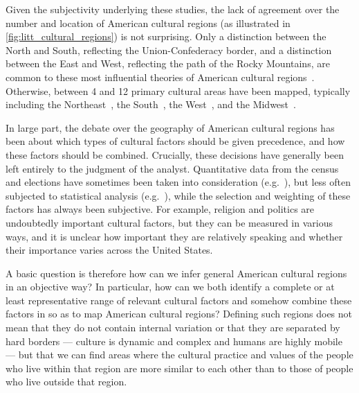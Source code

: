 \documentclass[../thesis.tex]{subfiles}
\begin{document}
Given the subjectivity underlying these studies, the lack of agreement over the number
and location of American cultural regions (as illustrated in
\cref{fig:litt_cultural_regions}) is not surprising. Only a distinction between the
North and South, reflecting the Union-Confederacy border, and a distinction between the
East and West, reflecting the path of the Rocky Mountains, are common to these most
influential theories of American cultural
regions~\cite{OdumSouthernRegions1936,ElazarCitiesPrairie1970,ZelinskyCulturalGeography1992,GastilCulturalRegions1975,GarreauNineNations1996,FischerAlbionSeed1989,LieskeRegionalSubcultures1993,WoodardAmericanNations2012}.
Otherwise, between 4 and 12 primary cultural areas have been mapped, typically including
the
Northeast~\cite{OdumSouthernRegions1936,ElazarCitiesPrairie1970,ZelinskyCulturalGeography1992,GastilCulturalRegions1975,GarreauNineNations1996,FischerAlbionSeed1989,LieskeRegionalSubcultures1993},
the
South~\cite{OdumSouthernRegions1936,ElazarCitiesPrairie1970,ZelinskyCulturalGeography1992,GastilCulturalRegions1975,GarreauNineNations1996,FischerAlbionSeed1989,LieskeRegionalSubcultures1993,WoodardAmericanNations2012},
the
West~\cite{OdumSouthernRegions1936,ElazarCitiesPrairie1970,ZelinskyCulturalGeography1992,GastilCulturalRegions1975,GarreauNineNations1996,WoodardAmericanNations2012},
and the
Midwest~\cite{OdumSouthernRegions1936,ElazarCitiesPrairie1970,ZelinskyCulturalGeography1992,GastilCulturalRegions1975,GarreauNineNations1996}.

In large part, the debate over the geography of American cultural regions has been about
which types of cultural factors should be given precedence, and how these factors should
be combined. Crucially, these decisions have generally been left entirely to the
judgment of the analyst. Quantitative data from the census and elections have sometimes
been taken into consideration
(e.g.~\cite{ZelinskyCulturalGeography1992,GastilCulturalRegions1975,LieskeRegionalSubcultures1993,WoodardAmericanNations2012}),
but less often subjected to statistical analysis
(e.g.~\cite{LieskeRegionalSubcultures1993}), while the selection and weighting of these
factors has always been subjective. For example, religion and politics are undoubtedly
important cultural factors, but they can be measured in various ways, and it is unclear
how important they are relatively speaking and whether their importance varies across
the United States.

A basic question is therefore how can we infer general American cultural regions in an
objective way? In particular, how can we both identify a complete or at least
representative range of relevant cultural factors and somehow combine these factors in
so as to map American cultural regions? Defining such regions does not mean that they do
not contain internal variation or that they are separated by hard borders --- culture is
dynamic and complex and humans are highly mobile --- but that we can find areas where the
cultural practice and values of the people who live within that region are more similar
to each other than to those of people who live outside that region.
\end{document}
